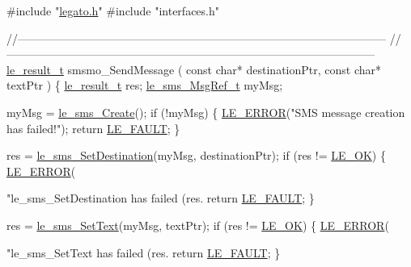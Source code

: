 \begin{DoxyCodeInclude}

\textcolor{preprocessor}{#include "\hyperlink{legato_8h}{legato.h}"}
\textcolor{preprocessor}{#include "interfaces.h"}


\textcolor{comment}{//--------------------------------------------------------------------------------------------------}
\textcolor{comment}{}\textcolor{comment}{//--------------------------------------------------------------------------------------------------}
\hyperlink{le__basics_8h_a1cca095ed6ebab24b57a636382a6c86c}{le\_result\_t} smsmo\_SendMessage
(
    \textcolor{keyword}{const} \textcolor{keywordtype}{char}*   destinationPtr, 
    \textcolor{keyword}{const} \textcolor{keywordtype}{char}*   textPtr         
)
\{
    \hyperlink{le__basics_8h_a1cca095ed6ebab24b57a636382a6c86c}{le\_result\_t}           res;
    \hyperlink{le__sms__interface_8h_a8eb2a15362fe26516fc68fd7a7d5e3e7}{le\_sms\_MsgRef\_t}      myMsg;

    myMsg = \hyperlink{le__sms__interface_8h_a668abcbcff2f1f3c5cdf799315a81058}{le\_sms\_Create}();
    \textcolor{keywordflow}{if} (!myMsg)
    \{
        \hyperlink{le__log_8h_a353590f91b3143a7ba3a416ae5a50c3d}{LE\_ERROR}(\textcolor{stringliteral}{"SMS message creation has failed!"});
        \textcolor{keywordflow}{return} \hyperlink{le__basics_8h_a1cca095ed6ebab24b57a636382a6c86cac409634423b6b1ef09643529f6224798}{LE\_FAULT};
    \}

    res = \hyperlink{le__sms__interface_8h_a145d3215f5601b88ef80b2674a9df226}{le\_sms\_SetDestination}(myMsg, destinationPtr);
    \textcolor{keywordflow}{if} (res != \hyperlink{le__basics_8h_a1cca095ed6ebab24b57a636382a6c86ca5066a4bcec691c6b67843b8f79656422}{LE\_OK})
    \{
        \hyperlink{le__log_8h_a353590f91b3143a7ba3a416ae5a50c3d}{LE\_ERROR}(\textcolor{stringliteral}{"le\_sms\_SetDestination has failed (res.%
        \textcolor{keywordflow}{return} \hyperlink{le__basics_8h_a1cca095ed6ebab24b57a636382a6c86cac409634423b6b1ef09643529f6224798}{LE\_FAULT};
    \}

    res = \hyperlink{le__sms__interface_8h_a34dc999430c46530d6c9067f800c5d72}{le\_sms\_SetText}(myMsg, textPtr);
    \textcolor{keywordflow}{if} (res != \hyperlink{le__basics_8h_a1cca095ed6ebab24b57a636382a6c86ca5066a4bcec691c6b67843b8f79656422}{LE\_OK})
    \{
        \hyperlink{le__log_8h_a353590f91b3143a7ba3a416ae5a50c3d}{LE\_ERROR}(\textcolor{stringliteral}{"le\_sms\_SetText has failed (res.%
        \textcolor{keywordflow}{return} \hyperlink{le__basics_8h_a1cca095ed6ebab24b57a636382a6c86cac409634423b6b1ef09643529f6224798}{LE\_FAULT};
    \}

}}
\end{DoxyCodeInclude}
